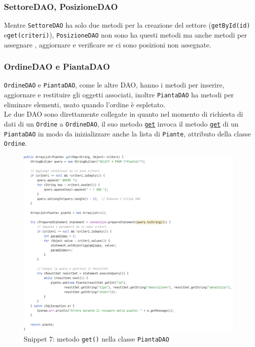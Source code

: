 \documentclass{article}
\newcommand{\code}[1]{\texttt{#1}}
\begin{document}
\subsubsection{SettoreDAO, PosizioneDAO}
Mentre \code{SettoreDAO} ha solo due metodi per la creazione del settore (\code{getById(id)} e\code{get(criteri)}), \code{PosizioneDAO} non sono ha questi metodi ma anche metodi per assegnare , aggiornare e verificare se ci sono posizioni non assegnate.

\subsubsection{OrdineDAO e PiantaDAO}
\code{OrdineDAO} e \code{PiantaDAO}, come le altre DAO, hanno i metodi per inserire, aggiornare e restituire gli oggetti associati, inoltre \code{PiantaDAO} ha metodi per eliminare elementi, usato quando l'ordine è espletato.\\
Le due DAO sono direttamente collegate in quanto nel momento di richiesta di dati di un \code{Ordine} a \code{OrdineDAO}, il suo metodo \hyperref[fig:snippet_OrdineDAOget]{\code{get}} invoca il metodo \hyperref[fig:snippet_piantaDAOget]{\code{get}} di un \code{PiantaDAO} in modo da inizializzare anche la lista di \code{Piante}, attributo della classe \code{Ordine}.

\begin{figure}[H]
    \centering
    \includegraphics[scale=0.5]{resources/images/Snippets/snippet_piantaDAOget.png}
    \captionsetup{labelformat=empty,labelsep=none}
    \caption{Snippet 7: metodo \code{get()} nella classe \code{PiantaDAO}}
    \label{fig:snippet_piantaDAOget}
\end{figure}
\end{document}

